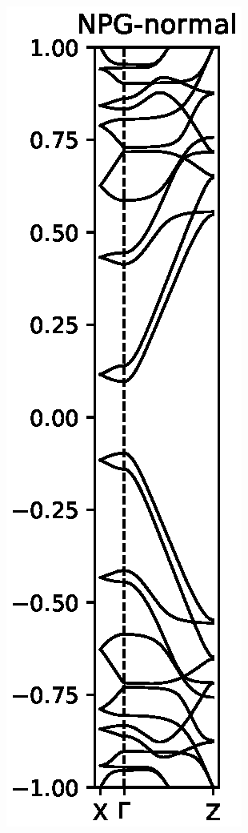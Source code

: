 \begin{figure}
	\centering
	\begin{subfigure}[b]{0.3\textwidth}
		\includegraphics[width=\textwidth]{Figures/FabNPGBS.eps}

\end{subfigure}
\end{figure}
